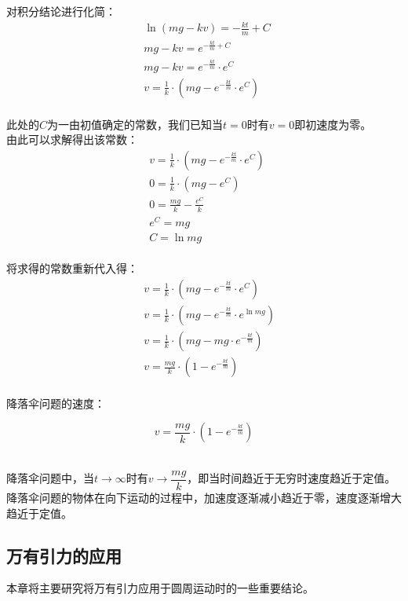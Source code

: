 \documentclass[UTF8]{ctexart}
\begin{document}
\newpage

    对积分结论进行化简：
    \begin{align}
        &\ln(mg-kv)=-\frac{kt}{m}+C~\\[3mm]
        &mg-kv=e^{-\frac{kt}{m}+C}\\[3mm]
        &mg-kv=e^{-\frac{kt}{m}}\cdot e^C\\[3mm]
        &v=\frac{1}{k}\cdot\left(mg-e^{-\frac{kt}{m}}\cdot e^C\right)~
    \end{align}\\
    此处的$C$为一由初值确定的常数，我们已知当$t=0$时有$v=0$即初速度为零。\\[3mm]
    由此可以求解得出该常数：
    \begin{align}
        &v=\frac{1}{k}\cdot\left(mg-e^{-\frac{kt}{m}}\cdot e^C\right)~\\[3mm]
        &0=\frac{1}{k}\cdot\left(mg-e^C\right)\\[3mm]
        &0=\frac{mg}{k}-\frac{e^C}{k}\\[3mm]
        &e^C=mg\\[3mm]
        &C=\ln{mg}
    \end{align}\\
    将求得的常数重新代入得：
    \begin{align}
        &~v=\frac{1}{k}\cdot\left(mg-e^{-\frac{kt}{m}}\cdot e^C\right)\\[3mm]
        &~v=\frac{1}{k}\cdot\left(mg-e^{-\frac{kt}{m}}\cdot e^{\ln{mg}}\right)\\[3mm]
        &~v=\frac{1}{k}\cdot\left(mg-mg\cdot e^{-\frac{kt}{m}}\right)\\[3mm]
        &~v=\frac{mg}{k}\cdot\left(1-e^{-\frac{kt}{m}}\right)
    \end{align}\\
    降落伞问题的速度：
    \begin{large}
        \begin{equation*}
            v=\frac{mg}{k}\cdot\left(1-e^{-\frac{kt}{m}}\right)
        \end{equation*}
    \end{large}\\
    降落伞问题中，当$t\rightarrow \infty$时有$v\rightarrow \dfrac{mg}{k}$，即当时间趋近于无穷时速度趋近于定值。\\[3mm]
    降落伞问题的物体在向下运动的过程中，加速度逐渐减小趋近于零，速度逐渐增大趋近于定值。

\newpage

\subsection{万有引力的应用}
    本章将主要研究将万有引力应用于圆周运动时的一些重要结论。
\end{document}
